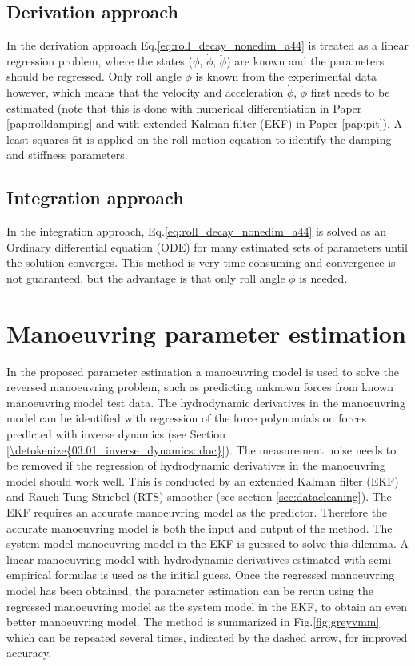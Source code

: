 \subsection{Derivation approach}\label{sec:derivation_approach}
In the derivation approach Eq.\ref{eq:roll_decay_nonedim_a44} is treated as a linear regression problem, where the states ($\phi$, $\dot{\phi}$, $\ddot{\phi}$) are known and the parameters should be regressed. Only roll angle $\phi$ is known from the experimental data however, which means that the velocity and acceleration $\dot{\phi}$, $\ddot{\phi}$ first needs to be estimated (note that this is done with numerical differentiation in Paper \ref{pap:rolldamping} and with extended Kalman filter (EKF) in Paper \ref{pap:pit}).
A least squares fit is applied on the roll motion equation to identify the damping and stiffness parameters.

\subsection{Integration approach}\label{sec:integration_approach}
In the integration approach, Eq.\ref{eq:roll_decay_nonedim_a44} is solved as an Ordinary differential equation (ODE) for many estimated sets of parameters until the solution converges. This method is very time consuming and convergence is not guaranteed, but the advantage is that only roll angle $\phi$ is needed.

\section{Manoeuvring parameter estimation} \label{sec:_VMM}
In the proposed parameter estimation a manoeuvring model is used to solve the reversed manoeuvring problem, such as predicting unknown forces from known manoeuvring model test data. The hydrodynamic derivatives in the manoeuvring model can be identified with regression of the force polynomials on forces predicted with inverse dynamics (see Section \ref{\detokenize{03.01_inverse_dynamics::doc}}).
The measurement noise needs to be removed if the regression of hydrodynamic derivatives in the manoeuvring model should work well. This is conducted by an extended Kalman filter (EKF) and Rauch Tung Striebel (RTS) smoother (see section \ref{sec:datacleaning}). The EKF requires an accurate manoeuvring model as the predictor.
Therefore the accurate manoeuvring model is both the input and output of the method. The system model manoeuvring model in the EKF is guessed to solve this dilemma. A linear manoeuvring model with hydrodynamic derivatives estimated with semi-empirical formulas is used as the initial guess. Once the regressed manoeuvring model has been obtained, the parameter estimation can be rerun using the regressed manoeuvring model as the system model in the EKF, to obtain an even better manoeuvring model. The method is summarized in Fig.\ref{fig:greyvmm} which can be repeated several times, indicated by the dashed arrow, for improved accuracy. 

